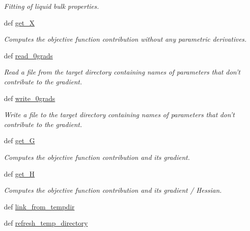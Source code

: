 \begin{DoxyCompactItemize}
\begin{DoxyCompactList}\small\item\em Fitting of liquid bulk properties. \end{DoxyCompactList}\item 
def \hyperlink{classforcebalance_1_1target_1_1Target_a606dd136f195c267c05a2455405e5949}{get\-\_\-\-X}
\begin{DoxyCompactList}\small\item\em Computes the objective function contribution without any parametric derivatives. \end{DoxyCompactList}\item 
def \hyperlink{classforcebalance_1_1target_1_1Target_a09bb0e8350a17974c908a9728b2709bf}{read\-\_\-0grads}
\begin{DoxyCompactList}\small\item\em Read a file from the target directory containing names of parameters that don't contribute to the gradient. \end{DoxyCompactList}\item 
def \hyperlink{classforcebalance_1_1target_1_1Target_acc7601caa4b719bf7e31961c2eb30dd7}{write\-\_\-0grads}
\begin{DoxyCompactList}\small\item\em Write a file to the target directory containing names of parameters that don't contribute to the gradient. \end{DoxyCompactList}\item 
def \hyperlink{classforcebalance_1_1target_1_1Target_afa8cc38c8bba8861c072e789717aa049}{get\-\_\-\-G}
\begin{DoxyCompactList}\small\item\em Computes the objective function contribution and its gradient. \end{DoxyCompactList}\item 
def \hyperlink{classforcebalance_1_1target_1_1Target_a1d2ee27fe86a09769c1816af23b09adb}{get\-\_\-\-H}
\begin{DoxyCompactList}\small\item\em Computes the objective function contribution and its gradient / Hessian. \end{DoxyCompactList}\item 
def \hyperlink{classforcebalance_1_1target_1_1Target_a5aa4958cea0a48138511567a076c5a82}{link\-\_\-from\-\_\-tempdir}
\item 
def \hyperlink{classforcebalance_1_1target_1_1Target_afe815eafab06ac92f10bbf4b88ad95c8}{refresh\-\_\-temp\-\_\-directory}

\end{DoxyCompactItemize}
